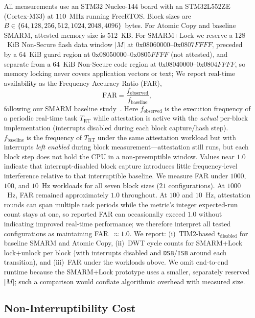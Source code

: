 \documentclass[conference]{IEEEtran}
\newcommand{\tdis}{$t_{\mathrm{disabled}}$\xspace}
\newcommand{\FAR}{FAR\xspace}
\newcommand{\smarmlock}{SMARM+Lock\xspace}
\begin{document}
All measurements use an STM32 Nucleo-144 board with an
STM32L552ZE (Cortex-M33) at $110$~MHz running FreeRTOS.
Block sizes are $B\in\{64,128,256,512,1024,2048,4096\}$~bytes.
For Atomic Copy and baseline SMARM, attested memory size is $512$~KB.
For \smarmlock{} we reserve a $128$~KiB Non-Secure flash data
window $|M|$ at $0\mathrm{x}08060000$--$0\mathrm{x}0807FFFF$, preceded
by a $64$~KiB guard region at
$0\mathrm{x}08050000$--$0\mathrm{x}0805FFFF$ (not attested), and separate
from a $64$~KiB Non-Secure code region at
$0\mathrm{x}08040000$--$0\mathrm{x}0804FFFF$, so memory locking never
covers application vectors or text;
We report real-time availability as the Frequency Accuracy Ratio
(\FAR),
\[
  \mathrm{FAR}=\frac{f_{\mathrm{observed}}}{f_{\mathrm{baseline}}},
\]
following our SMARM baseline study~\cite{smarmplus2026}.
Here $f_{\mathrm{observed}}$ is the execution frequency of a periodic
real-time task $T_{\mathrm{RT}}$ while attestation is active with the
\emph{actual} per-block implementation (interrupts disabled during each
block capture/hash step).
$f_{\mathrm{baseline}}$ is the frequency of $T_{\mathrm{RT}}$ under the
same attestation workload but with interrupts \emph{left enabled} during
block measurement---attestation still runs, but each block step does not
hold the CPU in a non-preemptible window.
Values near $1.0$ indicate that interrupt-disabled block capture
introduces little frequency-level interference relative to that
interruptible baseline.
We measure \FAR{} under $1000$, $100$, and $10$~Hz workloads for all
seven block sizes ($21$ configurations).
At $1000$~Hz, \FAR{} remained approximately $1.0$ throughout.
At $100$ and $10$~Hz, attestation rounds can span multiple task periods
while the metric's integer expected-run count stays at one, so reported
\FAR{} can occasionally exceed $1.0$ without indicating improved
real-time performance; we therefore interpret all tested configurations
as maintaining \FAR{}~$\approx 1.0$.
We report: (i)~TIM2-based \tdis{} for baseline SMARM and Atomic Copy,
(ii)~DWT cycle counts for \smarmlock{} lock+unlock per block (with
interrupts disabled and \texttt{DSB}/\texttt{ISB} around each transition),
and (iii)~\FAR{} under the workloads above. We omit end-to-end runtime
because the \smarmlock{} prototype uses a smaller, separately reserved
$|M|$; such a comparison would conflate algorithmic overhead with measured
size.

\subsection{Non-Interruptibility Cost}
\end{document}
